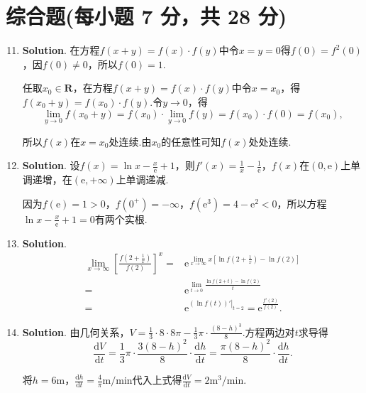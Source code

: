 \documentclass[../Main.tex]{subfiles}
\begin{document}
\section{综合题(每小题 7 分，共 28 分)}
\begin{enumerate}
    \setcounter{enumi}{10}
    \item \textbf{Solution}. 在方程$f(x+y)=f(x)\cdot f(y)$中令$x=y=0$得$f(0)
              =f^{2}(0)$，因$f(0)\neq0$，所以$f(0)=1$.

          任取$x_{0}\in\mathbf{R}$，在方程$f(x+y)=f(x)\cdot f(y)$中令$x=x_{0}$，得$f(
              x_{0}+y)=f(x_{0})\cdot f(y)$.令$y\to0$，得
          \[
              \lim_{y\to0}f(x_{0}+y)=f(x_{0})\cdot\lim_{y\to0}f(y)=f(x_{0})\cdot f(0)=f
              (x_{0}),
          \]

          所以$f(x)$在$x=x_{0}$处连续.由$x_{0}$的任意性可知$f(x)$处处连续.

    \item \textbf{Solution}. 设$f(x)=\ln x-\frac{x}{\mathrm{e}}+1$，则$f'(x)
              =\frac{1}{x}-\frac{1}{\mathrm{e}}$，$f(x)$在$(0,\mathrm{e})$上单调递增，在$(
              \mathrm{e},+\infty)$上单调递减.

          因为$f(\mathrm{e})=1>0$，$f(0^{+})=-\infty$，$f(\mathrm{e}^{3})=4-\mathrm{e}
              ^{2}<0$，所以方程$\ln x-\frac{x}{\mathrm{e}}+1=0$有两个实根.

    \item \textbf{Solution}.
          \[
              \begin{aligned}
                  \lim_{x\to\infty}\left[\frac{f\left(2+\frac{1}{x}\right)}{f(2)}\right]^{x} = & \mathrm{e}^{\lim\limits_{x\to\infty}x\left[\ln f\left(2+\frac{1}{x}\right)-\ln f(2)\right]} \\
                  =                                                                            & \mathrm{e}^{\lim\limits_{t\to0}\frac{\ln f(2+t)-\ln f(2)}{t}}                               \\
                  =                                                                            & \mathrm{e}^{\left.\left(\ln f(t)\right)'\right|_{t=2}}=\mathrm{e}^{\frac{f'(2)}{f(2)}}.
              \end{aligned}
          \]

    \item \textbf{Solution}. 由几何关系，$V=\frac{1}{3}\cdot 8 \cdot 8\pi-\frac{1}{3}
              \pi\cdot\frac{(8-h)^{3}}{8}$.方程两边对$t$求导得
          \[
              \frac{\mathrm{d}V}{\mathrm{d}t}=\frac{1}{3}\pi\cdot\frac{3(8-h)^{2}}{8}\cdot
              \frac{\mathrm{d}h}{\mathrm{d}t}=\frac{\pi(8-h)^{2}}{8}\cdot\frac{\mathrm{d}h}{\mathrm{d}t}
              .
          \]

          将$h=6\mathrm{m}$，$\frac{\mathrm{d}h}{\mathrm{d}t}=\frac{4}{\pi}\mathrm{m/min}$代入上式得$\frac{\mathrm{d}V}{\mathrm{d}t}
              =2\mathrm{m^3/min}$.
\end{enumerate}
\end{document}
